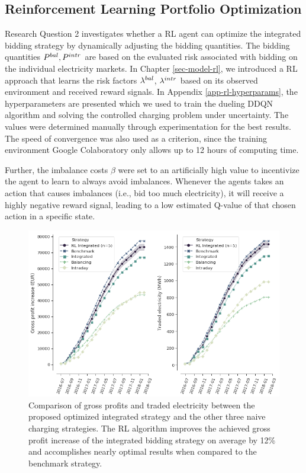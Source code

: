 \documentclass[a4paper, 12pt]{article}
\begin{document}
\subsection{Reinforcement Learning Portfolio Optimization}
\label{sec:orgd4337b9}
Research Question 2 investigates whether a RL agent can optimize the integrated
bidding strategy by dynamically adjusting the bidding quantities. The bidding
quantities \(P^{bal}_{}, P^{intr}_{}\) are based on the evaluated risk associated with
bidding on the individual electricity markets. In Chapter \ref{sec-model-rl}, we
introduced a RL approach that learns the risk factors \(\lambda^{bal}_{}\), \(\lambda^{intr}_{}\) based on
its observed environment and received reward signals. In Appendix
\ref{app-rl-hyperparams}, the hyperparameters are presented which we used to train
the dueling DDQN algorithm and solving the controlled charging problem under
uncertainty. The values were determined manually through experimentation for the
best results. The speed of convergence was also used as a criterion, since the
training environment Google Colaboratory only allows up to 12 hours of computing
time.

Further, the imbalance costs \(\beta\) were set to an artificially high value to
incentivize the agent to learn to always avoid imbalances. Whenever the agents
takes an action that causes imbalances (i.e., bid too much electricity), it will
receive a highly negative reward signal, leading to a low estimated Q-value of
that chosen action in a specific state.

\begin{figure}[h]
\centering
\includegraphics[width=1\linewidth]{fig/rl-results.png}
\caption[Comparison of gross profit results]{Comparison of gross profits and traded electricity between the proposed optimized integrated strategy and the other three naive charging strategies. The RL algorithm improves the achieved gross profit increase of the integrated bidding strategy on average by 12\% and accomplishes nearly optimal results when compared to the benchmark strategy. \label{fig-rl-profits}}
\end{figure}
\end{document}
